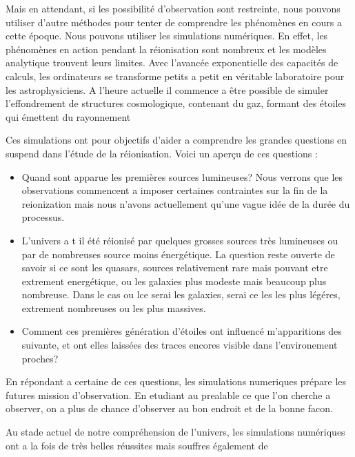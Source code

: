 Mais en attendant, si les possibilité d'observation sont restreinte, nous pouvons utiliser d'autre méthodes pour tenter de comprendre les phénomènes en cours a cette époque.
Nous pouvons utiliser les simulations numériques.
En effet, les phénomènes en action pendant la réionisation sont nombreux et les modèles analytique trouvent leurs limites.
Avec l'avancée exponentielle des capacités de calculs, les ordinateurs se transforme petits a petit en véritable laboratoire pour les astrophysiciens.
A l'heure actuelle il commence a être possible de simuler l'effondrement de structures cosmologique, contenant du gaz, formant des étoiles qui émettent du rayonnement 

Ces simulations ont pour objectifs d'aider a comprendre les grandes questions en suspend dans l'étude de la réionisation.
Voici un aperçu de ces questions : 

\begin{itemize}
\item Quand sont apparue les premières sources lumineuses?
Nous verrons que les observations commencent a imposer certaines contraintes sur la fin de la reionization mais  nous n'avons actuellement qu'une vague idée de la durée du processus.

\item L'univers a t il été réionisé par quelques grosses sources très lumineuses ou par de nombreuses source moins énergétique.
La question reste ouverte de savoir si ce sont les quasars, sources relativement rare mais pouvant etre extrement energétique, ou les galaxies plus modeste mais beaucoup plus nombreuse.
Dans le cas ou lce serai les galaxies, serai ce les les plus légéres, extrement nombreuses ou les plus massives.

\item Comment ces premières génération d'étoiles ont influencé m'apparitions des suivante, et ont elles laissées des traces encores visible dans l'environement proches?

\end{itemize} 

En répondant a certaine de ces questions, les simulations numeriques prépare les futures mission d'observation.
En etudiant au prealable ce que l'on cherche a  observer, on a plus de chance d'observer au bon endroit et de la bonne facon.


Au stade actuel de notre compréhension de l'univers, les simulations numériques ont a la fois de très belles réussites mais souffres également de 

